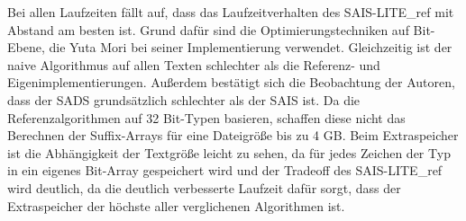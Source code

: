 \FloatBarrier
{}
\noindent Bei allen Laufzeiten fällt auf, dass das Laufzeitverhalten des SAIS-LITE\_ref mit Abstand am besten ist. Grund dafür sind die Optimierungstechniken auf Bit-Ebene, die Yuta Mori bei seiner Implementierung verwendet. Gleichzeitig ist der naive Algorithmus auf allen Texten schlechter als die Referenz- und Eigenimplementierungen. Außerdem bestätigt sich die Beobachtung der Autoren, dass der SADS grundsätzlich schlechter als der SAIS ist. Da die Referenzalgorithmen auf 32 Bit-Typen basieren, schaffen diese nicht das Berechnen der Suffix-Arrays für eine Dateigröße bis zu 4 GB. Beim Extraspeicher ist die Abhängigkeit der Textgröße leicht zu sehen, da für jedes Zeichen der Typ in ein eigenes Bit-Array gespeichert wird und der Tradeoff des SAIS-LITE\_ref wird deutlich, da die deutlich verbesserte Laufzeit dafür sorgt, dass der Extraspeicher der höchste aller verglichenen Algorithmen ist.
